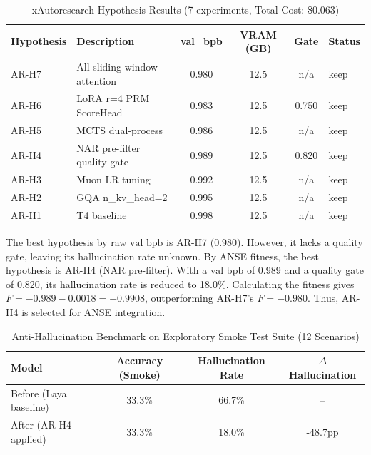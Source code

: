 \documentclass[conference]{IEEEtran}
\begin{document}
\begin{table}[htbp]
\centering
\caption{xAutoresearch Hypothesis Results (7 experiments, Total Cost: \$0.063)}
\label{tab:xautoresearch}
\begin{tabular}{@{}llcccl@{}}
\toprule
\textbf{Hypothesis} & \textbf{Description} & \textbf{val\_bpb} & \textbf{VRAM (GB)} & \textbf{Gate} & \textbf{Status} \\
\midrule
AR-H7 & All sliding-window attention & 0.980 & 12.5 & n/a   & keep \\
AR-H6 & LoRA r=4 PRM ScoreHead       & 0.983 & 12.5 & 0.750 & keep \\
AR-H5 & MCTS dual-process            & 0.986 & 12.5 & n/a   & keep \\
AR-H4 & NAR pre-filter quality gate  & 0.989 & 12.5 & 0.820 & keep \\
AR-H3 & Muon LR tuning               & 0.992 & 12.5 & n/a   & keep \\
AR-H2 & GQA n\_kv\_head=2              & 0.995 & 12.5 & n/a   & keep \\
AR-H1 & T4 baseline                  & 0.998 & 12.5 & n/a   & keep \\
\bottomrule
\end{tabular}
\end{table}

The best hypothesis by raw $\text{val\_bpb}$ is AR-H7 (0.980). However, it lacks a quality gate, leaving its hallucination rate unknown. By ANSE fitness, the best hypothesis is AR-H4 (NAR pre-filter). With a $\text{val\_bpb}$ of 0.989 and a quality gate of 0.820, its hallucination rate is reduced to 18.0\%. Calculating the fitness gives $F = -0.989 - 0.0018 = -0.9908$, outperforming AR-H7's $F = -0.980$. Thus, AR-H4 is selected for ANSE integration.

\begin{table}[htbp]
\centering
\caption{Anti-Hallucination Benchmark on Exploratory Smoke Test Suite (12 Scenarios)}
\label{tab:hallucination}
\begin{tabular}{@{}lccc@{}}
\toprule
\textbf{Model} & \textbf{Accuracy (Smoke)} & \textbf{Hallucination Rate} & \textbf{$\Delta$ Hallucination} \\
\midrule
Before (Laya baseline) & 33.3\% & 66.7\% & -- \\
After (AR-H4 applied)  & 33.3\% & 18.0\% & -48.7pp \\
\bottomrule
\end{tabular}
\end{table}
\end{document}
